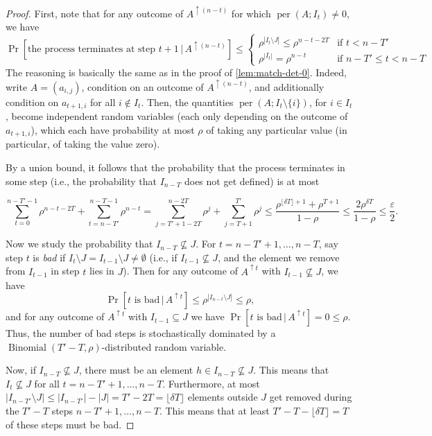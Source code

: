 \documentclass[10pt,a4paper]{amsart}
\newcommand{\on}{\operatorname}
\begin{document}
\begin{proof}
First, note that for any outcome
of $A^{\uparrow (n-t)}$ for which $\on{per}(A;I_{t})\ne0$, we have
\[
\Pr[\text{the process terminates at step }t+1\,|\,A^{\uparrow (n-t)}]\le\begin{cases}
\rho^{|I_{t}\setminus J|}\le\rho^{n-t-2T} & \text{if }t<n-T'\\
\rho^{|I_{t}|}=\rho^{n-t}& \text{if }n-T'\le t< n-T
\end{cases}
\]
The reasoning is basically the same as in the proof of \cref{lem:match-det-0}. Indeed,
write $A=(a_{i,j})$, condition on an outcome of $A^{\uparrow (n-t)}$,
and additionally condition on $a_{t+1,i}$ for all $i\notin I_{t}$.
Then, the quantities $\on{per}(A;I_{t}\setminus\{i\})$, for
$i\in I_{t}$, become independent random variables (each only depending on the outcome of $a_{t+1,i}$), which each have
probability at most $\rho$ of taking any particular value (in particular,
of taking the value zero).

By a union bound, it follows that the probability that the process terminates in some step (i.e., the probability that $I_{n-T}$ does not get defined) is at most

\[
\sum_{t=0}^{n-T'-1}\rho^{n-t-2T}+\sum_{t=n-T'}^{n-T-1}\rho^{n-t}=\sum_{j=T'+1-2T}^{n-2T}\rho^{j}+\sum_{j=T+1}^{T'}\rho^{j}\le \frac{\rho^{\lfloor \delta T\rfloor+1}+\rho^{T+1}}{1-\rho}\le \frac{2\rho^{\delta T}}{1-\rho}\le\frac{\varepsilon}{2}.
\]

Now we study the probability that $I_{n-T}\nsubseteq J$. For $t= n-T'+1,\dots,n-T$, say step $t$ is \emph{bad} if $I_{t}\setminus J=I_{t-1}\setminus J\ne \emptyset$ (i.e., if $I_{t-1}\nsubseteq J$, and the element we remove from $I_{t-1}$ in step $t$ lies in $J$). Then for any outcome of $A^{\uparrow t}$ with $I_{t-1}\nsubseteq J$, we have
\[
\Pr[t\text{ is bad}\,|\,A^{\uparrow t}]\le\rho^{|I_{n-t}\setminus J|}\le\rho,
\]
and for any outcome of $A^{\uparrow t}$ with $I_{t-1}\subseteq J$ we have $\Pr[t\text{ is bad}\,|\,A^{\uparrow t}]=0\le \rho$. Thus, the number of bad steps is stochastically dominated by a $\on{Binomial}(T'-T,\rho)$-distributed random variable.

Now, if $I_{n-T}\not\subseteq J$, there must be an element $h\in I_{n-T}\not\subseteq J$. This means that $I_{t}\not\subseteq J$ for all $t= n-T'+1,\dots,n-T$. Furthermore, at most $|I_{n-T'}\setminus J|\le |I_{n-T'}|-|J|=T'-2T=\lfloor \delta T\rfloor$ elements outside $J$ get removed during the $T'-T$ steps $n-T'+1,\dots,n-T$. This means that at least $T'-T-\lfloor \delta T\rfloor=T$ of these steps must be bad.


\end{proof}
\end{document}
